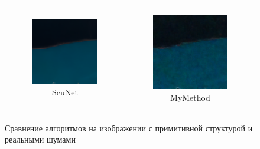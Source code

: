 \begin{figure}
\begin{tabular}{cc}
    \begin{subfigure}{0.3\textwidth}
      \includegraphics[width=\linewidth]{inc/research/simple/denoised_scunet.png}
      \caption{ScuNet}
    \end{subfigure} &
    \begin{subfigure}{0.3\textwidth}
      \includegraphics[width=\linewidth]{inc/research/simple/denoised_mycnn.png}
      \caption{MyMethod}
    \end{subfigure} \\
  \end{tabular}
  \caption{Сравнение алгоритмов на изображении с примитивной структурой и реальными шумами}
  \label{fig:simple}
\end{figure}

